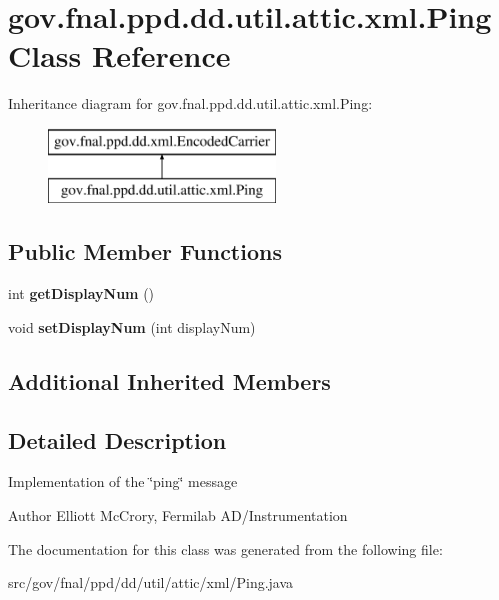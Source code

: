 \hypertarget{classgov_1_1fnal_1_1ppd_1_1dd_1_1util_1_1attic_1_1xml_1_1Ping}{\section{gov.\-fnal.\-ppd.\-dd.\-util.\-attic.\-xml.\-Ping Class Reference}
\label{classgov_1_1fnal_1_1ppd_1_1dd_1_1util_1_1attic_1_1xml_1_1Ping}
}
Inheritance diagram for gov.\-fnal.\-ppd.\-dd.\-util.\-attic.\-xml.\-Ping\-:\begin{figure}[H]
\begin{center}
\leavevmode
\includegraphics[height=2.000000cm]{classgov_1_1fnal_1_1ppd_1_1dd_1_1util_1_1attic_1_1xml_1_1Ping}
\end{center}
\end{figure}
\subsection*{Public Member Functions}
\begin{DoxyCompactItemize}
\item 
\hypertarget{classgov_1_1fnal_1_1ppd_1_1dd_1_1util_1_1attic_1_1xml_1_1Ping_a2f3a6dc740edcacde72bbc1523d5d7a6}{int {\bfseries get\-Display\-Num} ()}\label{classgov_1_1fnal_1_1ppd_1_1dd_1_1util_1_1attic_1_1xml_1_1Ping_a2f3a6dc740edcacde72bbc1523d5d7a6}

\item 
\hypertarget{classgov_1_1fnal_1_1ppd_1_1dd_1_1util_1_1attic_1_1xml_1_1Ping_ab5bde4cef4cf000d224f26ffd8b182e2}{void {\bfseries set\-Display\-Num} (int display\-Num)}\label{classgov_1_1fnal_1_1ppd_1_1dd_1_1util_1_1attic_1_1xml_1_1Ping_ab5bde4cef4cf000d224f26ffd8b182e2}

\end{DoxyCompactItemize}
\subsection*{Additional Inherited Members}


\subsection{Detailed Description}
Implementation of the \char`\"{}ping\char`\"{} message

\begin{DoxyAuthor}{Author}
Elliott Mc\-Crory, Fermilab A\-D/\-Instrumentation 
\end{DoxyAuthor}


The documentation for this class was generated from the following file\-:\begin{DoxyCompactItemize}
\item 
src/gov/fnal/ppd/dd/util/attic/xml/Ping.\-java\end{DoxyCompactItemize}
